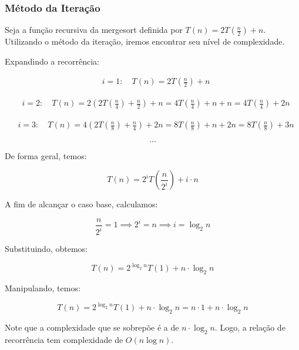 \subsubsection{Método da Iteração}
Seja a função recursiva da mergesort definida por \( T(n) = 2T\left(\frac{n}{2}\right) + n \). Utilizando o método da iteração, iremos encontrar seu nível de complexidade. 

Expandindo a recorrência:

\[
\begin{aligned}
&i = 1 : \quad T(n) = 2T\left(\frac{n}{2}\right) + n    
\end{aligned}
\]

\[
\begin{aligned}
&i = 2 : \quad T(n) = 2\left(2T\left(\frac{n}{4}\right) + \frac{n}{2}\right) + n = 4T\left(\frac{n}{4}\right) + n + n = 4T\left(\frac{n}{4}\right) + 2n
\end{aligned}
\]

\[
\begin{aligned}
&i = 3 : \quad T(n) = 4\left(2T\left(\frac{n}{8}\right) + \frac{n}{4}\right) + 2n = 8T\left(\frac{n}{8}\right) + n + 2n = 8T\left(\frac{n}{8}\right) + 3n
\end{aligned}
\]

\[
.
.
.
\]

De forma geral, temos:

\[
T(n) = 2^i T\left(\frac{n}{2^i}\right) + i \cdot n
\]

A fim de alcançar o caso base, calculamos:

\[
\frac{n}{2^i} = 1 \implies 2^i = n \implies i = \log_{2}{n}
\]

Substituindo, obtemos:

\[
T(n) = 2^{\log_{2}{n}} T(1) + n \cdot \log_{2}{n}
\]

Manipulando, temos:

\[
T(n) = 2^{\log_{2}{n}} T(1) + n \cdot \log_{2}{n} = n \cdot 1 + n \cdot \log_{2}{n}
\]

Note que a complexidade que se sobrepõe é a de \( n \cdot \log_{2}{n} \). Logo, a relação de recorrência tem complexidade de \( O(n \log n) \).
